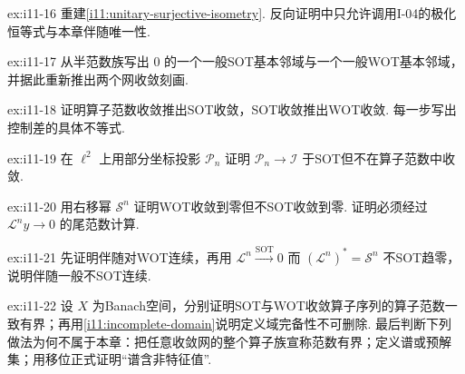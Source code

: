 \begin{FAExercise}[酉与满射等距]{ex:i11-16}
重建\autoref{i11:unitary-surjective-isometry}. 反向证明中只允许调用I-04的极化恒等式与本章伴随唯一性.
\end{FAExercise}

\begin{FAExercise}[强算子拓扑与弱算子拓扑的定义]{ex:i11-17}
从半范数族写出 \(\displaystyle0\) 的一个一般SOT基本邻域与一个一般WOT基本邻域，并据此重新推出两个网收敛刻画.
\end{FAExercise}

\begin{FAExercise}{ex:i11-18}
证明算子范数收敛推出SOT收敛，SOT收敛推出WOT收敛. 每一步写出控制差的具体不等式.
\end{FAExercise}

\begin{FAExercise}[强算子拓扑严格弱于范数拓扑]{ex:i11-19}
在 \(\displaystyle \ell^2\) 上用部分坐标投影 \(\displaystyle \mathcal P_n\) 证明 \(\displaystyle \mathcal P_n\to\mathcal I\) 于SOT但不在算子范数中收敛.
\end{FAExercise}

\begin{FAExercise}[弱算子拓扑严格弱于强算子拓扑]{ex:i11-20}
用右移幂 \(\displaystyle \mathcal S^n\) 证明WOT收敛到零但不SOT收敛到零. 证明必须经过 \(\displaystyle \mathcal L^ny\to0\) 的尾范数计算.
\end{FAExercise}

\begin{FAExercise}[伴随在两种算子拓扑下的差异]{ex:i11-21}
先证明伴随对WOT连续，再用 \(\displaystyle \mathcal L^n\overset{\mathrm{SOT}}{\longrightarrow}0\) 而 \(\displaystyle (\mathcal L^n)^*=\mathcal S^n\) 不SOT趋零，说明伴随一般不SOT连续.
\end{FAExercise}

\begin{FAExercise}[一致有界边界与禁止前向调用]{ex:i11-22}
设 \(\displaystyle X\) 为Banach空间，分别证明SOT与WOT收敛算子序列的算子范数一致有界；再用\autoref{i11:incomplete-domain}说明定义域完备性不可删除. 最后判断下列做法为何不属于本章：把任意收敛网的整个算子族宣称范数有界；定义谱或预解集；用移位正式证明“谱含非特征值”.
\end{FAExercise}
